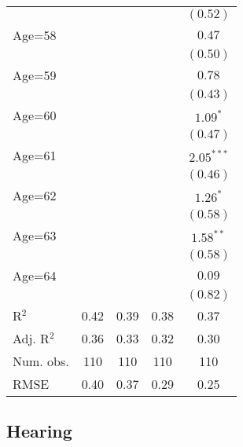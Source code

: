 \documentclass[fullpage]{paper}
\begin{document}
\begin{center}
\begin{longtable}{l c c c c }
            &               &               &               & $(0.52)$      \\
Age=58      &               &               &               & $0.47$        \\
            &               &               &               & $(0.50)$      \\
Age=59      &               &               &               & $0.78$        \\
            &               &               &               & $(0.43)$      \\
Age=60      &               &               &               & $1.09^{*}$    \\
            &               &               &               & $(0.47)$      \\
Age=61      &               &               &               & $2.05^{***}$  \\
            &               &               &               & $(0.46)$      \\
Age=62      &               &               &               & $1.26^{*}$    \\
            &               &               &               & $(0.58)$      \\
Age=63      &               &               &               & $1.58^{**}$   \\
            &               &               &               & $(0.58)$      \\
Age=64      &               &               &               & $0.09$        \\
            &               &               &               & $(0.82)$      \\
\hline
R$^2$       & 0.42          & 0.39          & 0.38          & 0.37          \\
Adj. R$^2$  & 0.36          & 0.33          & 0.32          & 0.30          \\
Num. obs.   & 110           & 110           & 110           & 110           \\
RMSE        & 0.40          & 0.37          & 0.29          & 0.25          \\
\end{longtable}
\end{center}
\subsection{ Hearing }
\end{document}
